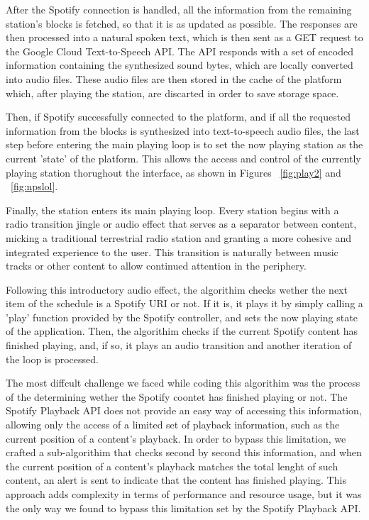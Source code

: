 After the Spotify connection is handled, all the information from the remaining station's blocks is fetched, so that it is as updated as possible. The responses are then processed into a natural spoken text, which is then sent as a GET request to the Google Cloud Text-to-Speech API. The API responds with a set of encoded information containing the synthesized sound bytes, which are locally converted into audio files. These audio files are then stored in the cache of the platform which, after playing the station, are discarted in order to save storage space.

Then, if Spotify successfully connected to the platform, and if all the requested information from the blocks is synthesized into text-to-speech audio files, the last step before entering the main playing loop is to set the now playing station as the current 'state' of the platform. This allows the access and control of the currently playing station thorughout the interface, as shown in Figures ~\ref{fig:play2} and ~\ref{fig:npslol}.

Finally, the station enters its main playing loop. Every station begins with a radio transition jingle or audio effect that serves as a separator between content, micking a traditional terrestrial radio station and granting a more cohesive and integrated experience to the user. This transition is naturally between music tracks or other content to allow continued attention in the periphery.

Following this introductory audio effect, the algorithim checks wether the next item of the schedule is a Spotify \ac{URI} or not. If it is, it plays it by simply calling a 'play' function provided by the Spotify controller, and sets the now playing state of the application. Then, the algorithim checks if the current Spotify content has finished playing, and, if so, it plays an audio transition and another iteration of the loop is processed.

The most diffcult challenge we faced while coding this algorithim was the process of the determining wether the Spotify coontet has finished playing or not. The Spotify Playback \ac{API} does not provide an easy way of accessing this information, allowing only the access of a limited set of playback information, such as the current position of a content's playback. In order to bypass this limitation, we crafted a sub-algorithim that checks second by second this information, and when the current position of a content's playback matches the total lenght of such content, an alert is sent to indicate that the content has finished playing. This approach adds complexity in terms of performance and resource usage, but it was the only way we found to bypass this limitation set by the Spotify Playback \ac{API}.

